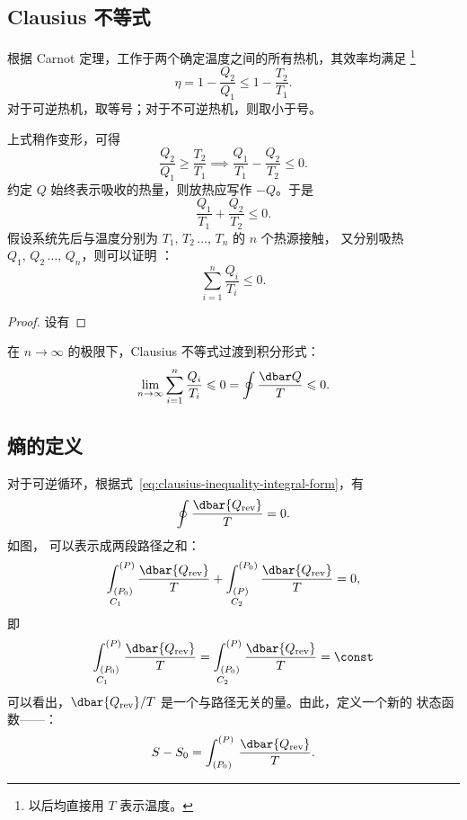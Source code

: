 \subsection{Clausius 不等式}

根据 Carnot 定理，工作于两个确定温度之间的所有热机，其效率均满足
\footnote{以后均直接用 $T$ 表示温度。}
\begin{equation}
  \eta = 1 - \frac{Q_2}{Q_1} \leqslant 1 - \frac{T_2}{T_1}.
\end{equation}
对于可逆热机，取等号；对于不可逆热机，则取小于号。

上式稍作变形，可得
\begin{equation}
  \frac{Q_2}{Q_1} \geqslant \frac{T_2}{T_1}
  \implies \frac{Q_1}{T_1} - \frac{Q_2}{T_2} \leqslant 0.
\end{equation}
约定 $Q$ 始终表示吸收的热量，则放热应写作 $-Q$。于是
\begin{equation}
  \frac{Q_1}{T_1} + \frac{Q_2}{T_2} \leqslant 0.
\end{equation}
假设系统先后与温度分别为 $T_1, \, T_2 \, \dots, \, T_n$ 的 $n$ 个热源接触，
又分别吸热 $Q_1, \, Q_2 \, \dots, \, Q_n$，则可以证明 ：
\begin{equation}
  \sum_{i=1}^n \frac{Q_i}{T_i} \leqslant 0.
\end{equation}

\begin{proof}
  设有 %
\end{proof}

在 $n\to\infty$ 的极限下，Clausius 不等式过渡到积分形式：
\begin{equation} \label{eq:clausius-inequality-integral-form}
  \lim_{n\to\infty} \sum_{i=1}^n \frac{Q_i}{T_i} \leqslant 0
  = \oint \frac{\dbar Q}{T} \leqslant 0.
\end{equation}

\subsection{熵的定义}

对于可逆循环，根据式~\eqref{eq:clausius-inequality-integral-form}，有
\begin{equation}
  \oint \frac{\dbar{Q_\text{rev}}}{T} = 0.
\end{equation}
如图，%
可以表示成两段路径之和：
\begin{equation}
  \underset{C_1\phantom{M}}{\int_{(P_0)}^{(P)}} \, \frac{\dbar{Q_\text{rev}}}{T}
  + \underset{C_2\phantom{M}}{\int_{(P)}^{(P_0)}} \, \frac{\dbar{Q_\text{rev}}}{T} = 0,
\end{equation}
即
\begin{equation}
  \underset{C_1\phantom{M}}{\int_{(P_0)}^{(P)}} \, \frac{\dbar{Q_\text{rev}}}{T}
  = \underset{C_2\phantom{M}}{\int_{(P_0)}^{(P)}} \, \frac{\dbar{Q_\text{rev}}}{T} = \const
\end{equation}
可以看出，$\dbar{Q_\text{rev}}/T$ 是一个与路径无关的量。由此，定义一个新的
状态函数——：
\begin{equation}
  S - S_0 = \int_{(P_0)}^{(P)} \, \frac{\dbar{Q_\text{rev}}}{T}.
\end{equation}

